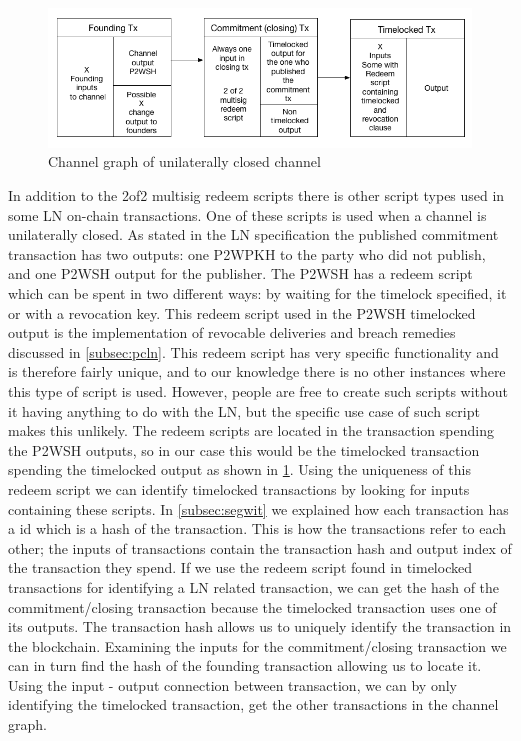 \begin{figure}[h]
    \centering
    \includegraphics[width=15cm]{figures/chan_graph.png}
    \caption{Channel graph of unilaterally closed channel}
    \label{fig:ln_tx_graph}
\end{figure}

In addition to the 2of2 multisig redeem scripts there is other script types used in some LN on-chain transactions. One of these scripts is used when a channel is unilaterally closed. As stated in the LN specification \cite{bolt3} the published commitment transaction has two outputs: one P2WPKH to the party who did not publish, and one P2WSH output for the publisher.
The P2WSH has a redeem script which can be spent in two different ways: by waiting for the timelock specified, it or with a revocation key. This redeem script used in the P2WSH timelocked output is the implementation of revocable deliveries and breach remedies discussed in \cref{subsec:pcln}.
This redeem script has very specific functionality and is therefore fairly unique, and to our knowledge there is no other instances where this type of script is used. However, people are free to create such scripts without it having anything to do with the LN, but the specific use case of such script makes this unlikely. The redeem scripts are located in the transaction spending the P2WSH outputs, so in our case this would be the timelocked transaction spending the timelocked output as shown in \cref{fig:ln_tx_graph}. Using the uniqueness of this redeem script we can identify timelocked transactions by looking for inputs containing these scripts. 
In \cref{subsec:segwit} we explained how each transaction has a id which is a hash of the transaction. This is how the transactions refer to each other; the inputs of transactions contain the transaction hash and output index of the transaction they spend. If we use the redeem script found in timelocked transactions for identifying a LN related transaction, we can get the hash of the commitment/closing transaction because the timelocked transaction uses one of its outputs. The transaction hash allows us to uniquely identify the transaction in the blockchain. Examining the inputs for the commitment/closing transaction we can in turn find the hash of the founding transaction allowing us to locate it. Using the input - output connection between transaction, we can by only identifying the timelocked transaction, get the other transactions in the channel graph. 
\\


